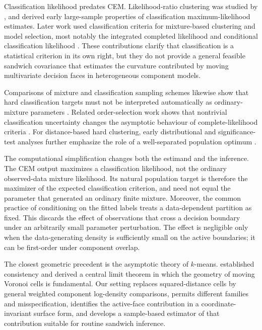 \documentclass[numsec,webpdf,modern,medium,namedate]{oup-authoring-template}
\theoremstyle{plain}
\theoremstyle{definition}
\theoremstyle{remark}
\begin{document}
Classification likelihood predates CEM. Likelihood-ratio clustering was
studied by \citet{scott1971clustering}, and
\citet{bryant1978classification} derived early large-sample properties of
classification maximum-likelihood estimates. Later work used classification
criteria for mixture-based clustering and model selection, most notably the
integrated completed likelihood \citep{biernacki2000icl} and conditional
classification likelihood \citep{baudry2015conditional}. These contributions
clarify that classification is a statistical criterion in its own right, but
they do not provide a general feasible sandwich covariance that estimates the
curvature contributed by moving multivariate decision faces in heterogeneous
component models.

Comparisons of mixture and classification sampling schemes likewise show that
hard classification targets must not be interpreted automatically as
ordinary-mixture parameters \citep{ganesalingam1989classification}. Related
order-selection work shows that nontrivial classification uncertainty changes
the asymptotic behaviour of complete-likelihood criteria \citep{hui2015order}.
For distance-based hard clustering, early distributional and
significance-test analyses further emphasize the role of a well-separated
population optimum \citep{hartigan1978asymptotic,bock1985probabilistic}.

The computational simplification changes both the estimand and the inference.
The CEM output maximizes a classification likelihood, not the ordinary
observed-data mixture likelihood.  Its natural population target is therefore
the maximizer of the expected classification criterion, and need not equal the
parameter that generated an ordinary finite mixture.  Moreover, the common
practice of conditioning on the fitted labels treats a data-dependent
partition as fixed.  This discards the effect of observations that cross a
decision boundary under an arbitrarily small parameter perturbation.  The
effect is negligible only when the data-generating density is sufficiently
small on the active boundaries; it can be first-order under component overlap.

The closest geometric precedent is the asymptotic theory of $k$-means.
\citet{pollard1981strong} established consistency and
\citet{pollard1982clt} derived a central limit theorem in which the geometry of
moving Voronoi cells is fundamental. Our setting replaces squared-distance
cells by general weighted component log-density comparisons, permits different
families and misspecification, identifies the active-face contribution in a
coordinate-invariant surface form, and develops a sample-based estimator of
that contribution suitable for routine sandwich inference.
\end{document}
